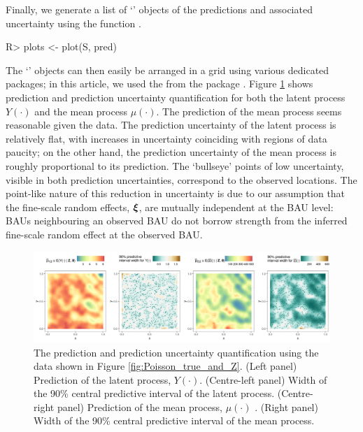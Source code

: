\documentclass[nojss]{jss}
\newcommand{\class}[1]{`\code{#1}'}
\newcommand{\fct}[1]{\code{#1()}}
\def\mbf#1{{%
\mathchoice%
{\hbox{\boldmath$\displaystyle{#1}$}}%
{\hbox{\boldmath$\textstyle{#1}$}}%
{\hbox{\boldmath$\scriptstyle{#1}$}}%
{\hbox{\boldmath$\scriptscriptstyle{#1}$}}%
}}
\def\vec{\mbf}
\begin{document}
Finally, we generate a list of \class{ggplot} \citep{Wickham_2016_ggplot2} objects of the predictions and associated uncertainty using the function \fct{plot}. 
\begin{Code}
R> plots <- plot(S, pred)
\end{Code}
The \class{ggplot} objects can then easily be arranged in a grid using various dedicated packages; in this article, we used the \fct{ggarrange} from the package  \citep{Kassambara_2020_ggpubr}. Figure \ref{fig:Poisson_nres3} shows prediction and prediction uncertainty quantification for both the latent process $Y(\cdot)$ and the mean process $\mu(\cdot)$. %
The prediction of the mean process seems reasonable given the data. 
The prediction uncertainty of the latent process is relatively flat, with increases in uncertainty coinciding with regions of data paucity; on the other hand, the prediction uncertainty of the mean process is roughly proportional to its prediction. %
The  `bullseye' points of low uncertainty, visible in both prediction uncertainties, correspond to the observed locations. 
The point-like nature of this reduction in uncertainty is due to our assumption that the fine-scale random effects, $\vec{\xi}$, are mutually independent at the BAU level: BAUs neighbouring an observed BAU do not borrow strength from the inferred fine-scale random effect at the observed BAU.
\begin{figure}[t!]
    \centering
    \includegraphics[width = \linewidth]{img/Poisson_sim.png}
    \caption{The prediction and prediction uncertainty quantification using the data shown in Figure \ref{fig:Poisson_true_and_Z}. (Left panel) Prediction of the latent process, $Y(\cdot)$. (Centre-left panel) Width of the 90\% central predictive interval of the latent process. (Centre-right panel) Prediction of the mean process, $\mu(\cdot)$ . (Right panel) Width of the 90\% central predictive interval of the mean process. 
}   
  \label{fig:Poisson_nres3}
\end{figure}
\end{document}

